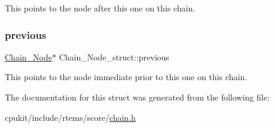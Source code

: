 This points to the node after this one on this chain. \mbox{\label{structChain__Node__struct_a17c1c8c2bc86cbb75f64de710fafd576}} 
\subsubsection{\texorpdfstring{previous}{previous}}
{\footnotesize\ttfamily \mbox{\hyperlink{group__RTEMSScoreChain_ga0dd4bfcca1ac7f90de2842e447846d3d}{Chain\+\_\+\+Node}}$\ast$ Chain\+\_\+\+Node\+\_\+struct\+::previous}

This points to the node immediate prior to this one on this chain. 

The documentation for this struct was generated from the following file\+:\begin{DoxyCompactItemize}
\item 
cpukit/include/rtems/score/\mbox{\hyperlink{score_2chain_8h}{chain.\+h}}\end{DoxyCompactItemize}
